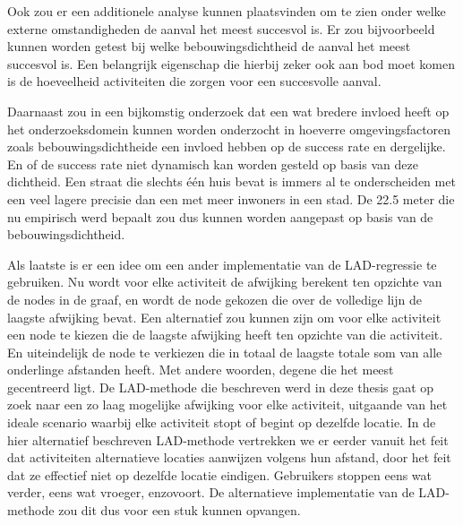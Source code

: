 Ook zou er een additionele analyse kunnen plaatsvinden om te zien onder welke
externe omstandigheden de aanval het meest succesvol is. Er zou bijvoorbeeld
kunnen worden getest bij welke bebouwingsdichtheid de aanval het meest
succesvol is. Een belangrijk eigenschap die hierbij zeker ook aan bod moet
komen is de hoeveelheid activiteiten die zorgen voor een succesvolle aanval.

Daarnaast zou in een bijkomstig onderzoek dat een wat bredere invloed heeft op
het onderzoeksdomein kunnen worden onderzocht in hoeverre omgevingsfactoren
zoals bebouwingsdichtheide een invloed hebben op de success rate en dergelijke.
En of de success rate niet dynamisch kan worden gesteld op basis van deze
dichtheid. Een straat die slechts één huis bevat is immers al te onderscheiden
met een veel lagere precisie dan een met meer inwoners in een stad. De 22.5
meter die nu empirisch werd bepaalt zou dus kunnen worden aangepast op basis
van de bebouwingsdichtheid.

Als laatste is er een idee om een ander implementatie van de \ac{LAD}-regressie
te gebruiken. Nu wordt voor elke activiteit de afwijking berekent ten opzichte
van de nodes in de graaf, en wordt de node gekozen die over de volledige lijn
de laagste afwijking bevat. Een alternatief zou kunnen zijn om voor elke
activiteit een node te kiezen die de laagste afwijking heeft ten opzichte van
die activiteit. En uiteindelijk de node te verkiezen die in totaal de laagste
totale som van alle onderlinge afstanden heeft. Met andere woorden, degene die
het meest gecentreerd ligt. De \ac{LAD}-methode die beschreven werd in deze
thesis gaat op zoek naar een zo laag mogelijke afwijking voor elke activiteit,
uitgaande van het ideale scenario waarbij elke activiteit stopt of begint op
dezelfde locatie. In de hier alternatief beschreven \ac{LAD}-methode vertrekken
we er eerder vanuit het feit dat activiteiten alternatieve locaties aanwijzen
volgens hun afstand, door het feit dat ze effectief niet op dezelfde locatie
eindigen. Gebruikers stoppen eens wat verder, eens wat vroeger, enzovoort. De
alternatieve implementatie van de \ac{LAD}-methode zou dit dus voor een stuk
kunnen opvangen.



